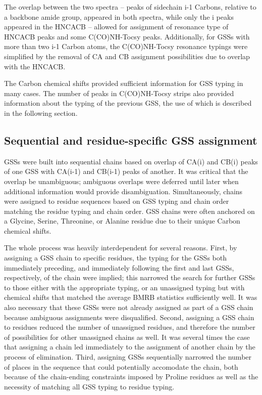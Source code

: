 The overlap between the two spectra -- peaks of sidechain i-1 Carbons, relative
to a backbone amide group, appeared in both spectra, while only the i peaks
appeared in the HNCACB -- allowed for assignment of resonance type of HNCACB
peaks and some C(CO)NH-Tocsy peaks.  Additionally, for GSSs with more than two
i-1 Carbon atoms, the C(CO)NH-Tocsy resonance typings were simplified by the
removal of CA and CB assignment possibilities due to overlap with the HNCACB.

The Carbon chemical shifts provided sufficient information for GSS typing
in many cases.  The number of peaks in C(CO)NH-Tocsy strips also provided 
information about the typing of the previous GSS, the use of which is described
in the following section.

\subsection*{Sequential and residue-specific GSS assignment}
GSSs were built into sequential chains based on overlap of CA(i) and CB(i) 
peaks of one GSS with CA(i-1) and CB(i-1) peaks of another.  It was critical
that the overlap be unambiguous; ambiguous overlaps were deferred until later
when additional information would provide disambiguation.
Simultaneously, chains were assigned to residue sequences based on GSS typing
and chain order matching the residue typing and chain order.  GSS chains
were often anchored on a Glycine, Serine, Threonine, or Alanine residue due
to their unique Carbon chemical shifts.

The whole process was heavily interdependent for several reasons.  First, by
assigning a GSS chain to specific residues, the typing for the GSSs both
immediately preceding, and immediately following the first and last GSSs,
respectively, of the chain were implied; this narrowed the search for further
GSSs to those either with the appropriate typing, or an unassigned typing but
with chemical shifts that matched the average BMRB statistics sufficiently 
well.  It was also necessary that these GSSs were not already assigned as 
part of a GSS chain because ambiguous assignments were disqualified.
Second, assigning a GSS chain to residues reduced the number of unassigned
residues, and therefore the number of possibilities for other unassigned chains
as well.  It was several times the case that assigning a chain led immediately
to the assignment of another chain by the process of elimination.  Third,
assigning GSSs sequentially narrowed the number of places in the sequence that
could potentially accomodate the chain, both because of the chain-ending
constraints imposed by Proline residues as well as the necessity of matching
all GSS typing to residue typing.

